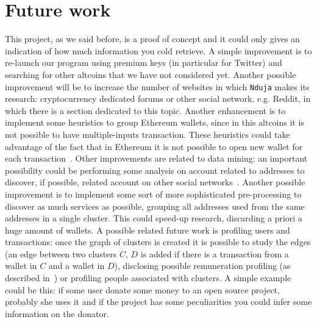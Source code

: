 \section{Future work} \label{future}
This project, as we said before, is a proof of concept and it could only gives
an indication of how much information you cold retrieve. A simple improvement
is to re-launch our program using premium keys (in particular for Twitter) and
searching for other altcoins that we have not considered yet. Another possible
improvement will be to increase the number of websites in which \texttt{Nduja}
makes its research: cryptocurrency dedicated forums or other social network,
e.g. Reddit, in which there is a section dedicated to this topic. Another
enhancement is to implement some heuristics to group Ethereum wallets, since in
this altcoins it is not possible to have multiple-inputs transaction. These
heuristics could take advantage of the fact that in Ethereum it is
not possible to open new wallet for each transaction~\cite{bib:ethersok}.
 Other
improvements are related to data mining: an important possibility could be
performing some analysis on account related to addresses to discover, if
possible, related account on other social networks~\cite{bib:osinference}.
Another possible improvement is to implement some sort of more sophisticated
pre-processing to discover as much services as possible, grouping all addresses
used from the same addresses in a single cluster. This could speed-up research,
discarding a priori a huge amount of wallets. A possible related future work is
profiling users and transactions: once the graph of clusters is created it is
possible to study the edges (an edge between two clusters $C$, $D$ is added
if there is a transaction from a wallet in $C$ and a wallet in $D$), disclosing
possible remuneration profiling (as described in~\cite{bib:fullDiscl}) or
profiling people associated with clusters. A simple example could be this: if
some user donate some money to an open source project, probably she uses it and
if the project has some peculiarities you could infer some information on the
donator.